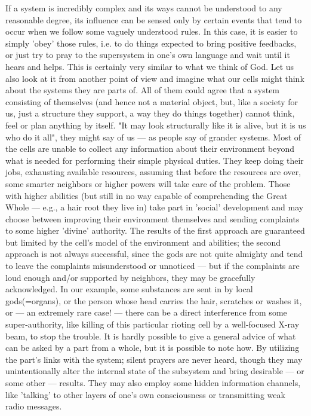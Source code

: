      If a  system  is  incredibly  complex  and  its  ways  cannot  be
understood  to any reasonable degree, its influence can be sensed only
by certain events that tend to  occur  when  we  follow  some  vaguely
understood  rules.   In this case, it is easier to simply 'obey' those
rules, i.e.  to do things expected to  bring  positive  feedbacks,  or
just  try  to  pray  to the supersystem in one's own language and wait
until it hears and helps.  This is certainly very similar to  what  we
think  of  God.  Let us also look at it from another point of view and
imagine what our cells might think about the systems  they  are  parts
of.   All  of  them could agree that a system consisting of themselves
(and hence not a material object, but, like a society for us,  just  a
structure  they  support, a way they do things together) cannot think,
feel or plan anything by itself.  "It may look structurally like it is
alive,  but  it is us who do it all", they might say of us --- as people
say of grander systems.  Most of the cells are unable to  collect  any
information   about  their  environment  beyond  what  is  needed  for
performing their simple physical duties.  They keep doing their  jobs,
exhausting available resources, assuming that before the resources are
over, some smarter neighbors or higher powers will take  care  of  the
problem.   Those with higher abilities (but still in no way capable of
comprehending the Great Whole --- e.g., a hair root they live  in)  take
part  in  'social'  development and may choose between improving their
environment themselves and sending complaints to some higher  'divine'
authority.   The  results  of  the  first  approach are guaranteed but
limited by the cell's model of  the  environment  and  abilities;  the
second approach is not always successful, since the gods are not quite
almighty and tend to leave the complaints misunderstood or unnoticed ---
but  if  the complaints are loud enough and/or supported by neighbors,
they may be gracefully acknowledged.  In our example, some  substances
are  sent  in by local gods(=organs), or the person whose head carries
the hair, scratches or washes it, or ---  an  extremely  rare  case!   ---
there  can  be  a  direct interference from some super-authority, like
killing of this particular rioting cell by a well-focused X-ray  beam,
to  stop  the trouble.  It is hardly possible to give a general advice
of what can be asked by a part from a whole, but  it  is  possible  to
note  how.   By  utilizing  the  part's  links with the system; silent
prayers are never heard, though they  may  unintentionally  alter  the
internal  state of the subsystem and bring desirable --- or some other ---
results.  They may also employ some hidden information channels,  like
'talking'  to  other layers of one's own consciousness or transmitting
weak radio messages.



